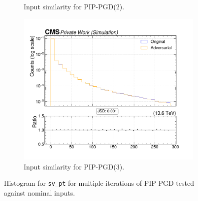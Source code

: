 \begin{figure}[htbp]
\begin{subfigure}[t]{0.32\textwidth}
    \caption*{Input similarity for PIP-PGD(2).}
  \end{subfigure}\hfill
  \begin{subfigure}[t]{0.32\textwidth}
    \includegraphics[width=\linewidth]{media/output/features/compare/combined_it_3/cmp_vtx_arr_sv_pt.pdf}
    \caption*{Input similarity for PIP-PGD(3).}
  \end{subfigure}

  \caption*{Histogram for \texttt{sv\_pt} for multiple iterations of PIP-PGD tested against nominal inputs.}
  \label{fig:combined_input_sv_pt}
\end{figure}

\newpage